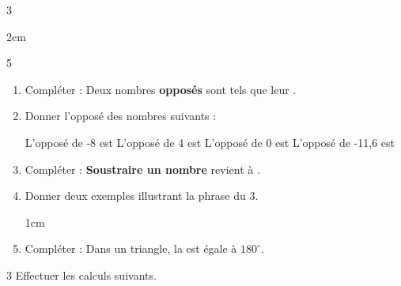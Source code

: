 \documentclass[a4paper]{book}
\begin{document}
{\begin{exerciceNote}{3}
\begin{enumerate}[leftmargin=*]
            \begin{ZoneReponse}{2cm}       
            \end{ZoneReponse}
        \end{enumerate}
    \end{exerciceNote}


    \begin{exerciceNote}{5}
        \begin{enumerate}[leftmargin=*]
            \item Compléter : Deux nombres \textbf{opposés} sont tels que leur \dotfill .

            \medskip
            
            \item Donner l'opposé des nombres suivants : 

            \begin{center}
                L'opposé de -8 est \points[2] \quad \quad
                L'opposé de 4 est \points[2] \quad \quad
                L'opposé de 0 est \points[2] \quad \quad
                L'opposé de -11,6 est \points[2]
            \end{center}

            \item Compléter : \textbf{Soustraire un nombre} revient à \dotfill.

            \item Donner deux exemples illustrant la phrase du 3.
            \begin{ZoneReponse}{1cm}
            \end{ZoneReponse}

            \item Compléter : Dans un triangle, la \points[25] est égale à $180^\circ$.
        \end{enumerate}    
    \end{exerciceNote}


\newpage


    \begin{exerciceNote}{3}
        Effectuer les calculs suivants.
        

\end{exerciceNote}}
\end{document}

